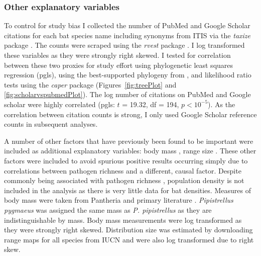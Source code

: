 \subsubsection{Other explanatory variables}



To control for study bias I collected the number of PubMed and Google Scholar citations for each bat species name including synonyms from ITIS \cite{itis} via the \emph{taxize} package \cite{chamberlain2013taxize}.
The counts were scraped using the \emph{rvest} package \cite{rvest}.
I log transformed these variables as they were strongly right skewed.
I tested for correlation between these two proxies for study effort using phylogenetic least squares regression (pgls), using the best-supported phylogeny from \textcite{fritz2009geographical}, and likelihood ratio tests using the \emph{caper} package \cite{caper} (Figures~\ref{fig:treePlot} and \ref{fig:scholarvspubmedPlot}).
The log number of citations on PubMed and Google scholar were highly correlated (pgls: $t$ = 19.32, df = 194, $p < 10^{-5}$).
As the correlation between citation counts is strong, I only used Google Scholar reference counts in subsequent analyses.

A number of other factors that have previously been found to be important were included as additional explanatory variables: body mass \cite{kamiya2014determines, turmelle2009correlates, gay2014parasite, maganga2014bat, han2015infectious, bordes2008bat}, range size \cite{kamiya2014determines, turmelle2009correlates, maganga2014bat}.		
These other factors were included to avoid spurious positive results occurring simply due to correlations between pathogen richness and a different, causal factor.
Despite commonly being associated with pathogen richness \cite{arneberg2002host, kamiya2014determines, nunn2003comparative}, population density is not included in the analysis as there is very little data for bat densities.
Measures of body mass were taken from Pantheria \cite{jones2009pantheria} and primary literature \cite{canals2005relative, arita1993rarity, lopez2014echolocation, orr2013does, lim2001bat, aldridge1987turning, ma2003dietary, owen2003home, henderson2008movements, heaney2012nyctalus, oleksy2015high, zhang2009recent}. 
\emph{Pipistrellus pygmaeus} was assigned the same mass as \emph{P. pipistrellus} as they are indistinguishable by mass.
Body mass measurements were log transformed as they were strongly right skewed.
Distribution size was estimated by downloading range maps for all species from IUCN \cite{iucn} and were also log transformed due to right skew.




